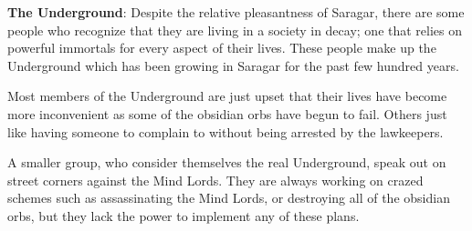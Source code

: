 {
	\textbf{The Underground}: Despite the relative pleasantness of Saragar, there are some people who recognize that they are living in a society in decay; one that relies on powerful immortals for every aspect of their lives. These people make up the Underground which has been growing in Saragar for the past few hundred years.

	Most members of the Underground are just upset that their lives have become more inconvenient as some of the obsidian orbs have begun to fail. Others just like having someone to complain to without being arrested by the lawkeepers.

	A smaller group, who consider themselves the real Underground, speak out on street corners against the Mind Lords. They are always working on crazed schemes such as assassinating the Mind Lords, or destroying all of the obsidian orbs, but they lack the power to implement any of these plans.
}
